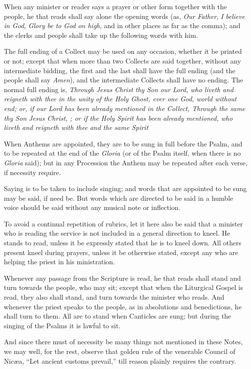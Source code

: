 When any minister or reader says a prayer or other form together with the people, he that reads shall say alone the opening words (as, \emph{Our Father}, \emph{I believe in God}, \emph{Glory be to God on high}, and in other places as far as the comma); and the clerks and people shall take up the following words with him.

The full ending of a Collect may be used on any occasion, whether it be printed or not; except that when more than two Collects are said together, without any intermediate bidding, the first and the last shall have the full ending (and the people shall say \emph{Amen}), and the intermediate Collects shall have no ending. The normal full ending is, \emph{Through Jesus Christ thy Son our Lord, who liveth and reigneth with thee in the unity of the Holy Ghost, ever one God, world without end; \emph{or, if our Lord has been already mentioned in the Collect,} Through the same thy Son Jesus Christ, \etc; \emph{or if the Holy Spirit has been already mentioned,} who liveth and reigneth with thee and the same Spirit \etc}


When Anthems are appointed, they are to be sung in full before the Psalm, and to be repeated at the end of the \emph{Gloria} (or of the Psalm itself, when there is no \emph{Gloria} said); but in any Procession the Anthem may be repeated after each verse, if necessity require.

Saying is to be taken to include singing; and words that are appointed to be sung may be said, if need be. But words which are directed to be said in a humble voice should be said without any musical note or inflection.


To avoid a continual repetition of rubrics, let it here also be said that a minister who is reading the service is not included in a general direction to kneel. He stands to read, unless it be expressly stated that he is to kneel down. All others present kneel during prayers, unless it be otherwise stated, except any who are helping the priest in his ministration.

Whenever any passage from the Scripture is read, he that reads shall stand and turn towards the people, who may sit; except that when the Liturgical Gospel is read, they also shall stand, and turn towards the minister who reads. And whenever the priest speaks to the people, as in absolutions and benedictions, he shall turn to them. All are to stand when Canticles are sung; but during the singing of the Psalms it is lawful to sit.


And since there must of necessity be many things not mentioned in these Notes, we may well, for the rest, observe that golden rule of the venerable Council of Nicæa, “Let ancient customs prevail,” till reason plainly requires the contrary.


\fleuron
